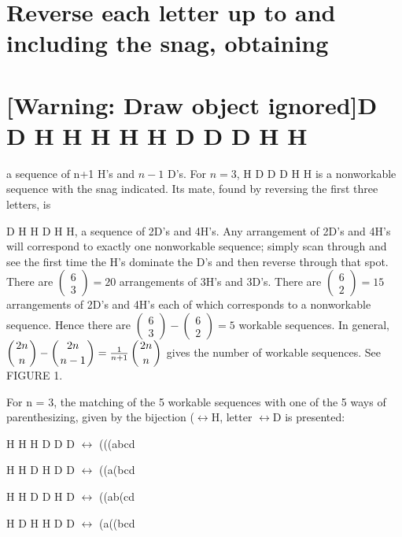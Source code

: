 \documentclass{article}
\begin{document}
\section[Reverse each letter up to and including the snag, obtaining]{Reverse each letter up to and including the snag,
obtaining}
\section[D D H H H H H D D D H H]{[Warning: Draw object ignored]D D H H H H H D D D H H}
a sequence of n+1 H’s and  $n-1$ D’s. For  $n=3$, H D D D H H is a nonworkable sequence with the snag indicated. Its
mate, found by reversing the first three letters, is 

D H H D H H, a sequence of 2D’s and 4H’s. Any arrangement of 2D’s and 4H’s will correspond to exactly one nonworkable
sequence; simply scan through and see the first time the H’s dominate the D’s and then reverse through that spot. There
are  $\left(\begin{matrix}6\\3\end{matrix}\right)=20$ arrangements of 3H’s and 3D’s. There are 
$\left(\begin{matrix}6\\2\end{matrix}\right)=15$ arrangements of 2D’s and 4H’s each of which corresponds to a
nonworkable sequence. Hence there are 
$\left(\begin{matrix}6\\3\end{matrix}\right)-\left(\begin{matrix}6\\2\end{matrix}\right)=5$ workable sequences. In
general,  $\left(\genfrac{}{}{0pt}{0}{2n}n\right)-\left(\genfrac{}{}{0pt}{0}{2n}{n-1}\right)=\frac
1{n+1}\left(\genfrac{}{}{0pt}{0}{2n}n\right)$ gives the number of workable sequences. See FIGURE 1.

For n = 3, the matching of the 5 workable sequences with one of the 5 ways of parenthesizing, given by the bijection
($\leftrightarrow $H, letter $\leftrightarrow $D is presented:

H H H D D D $\leftrightarrow $ (((abcd

H H D H D D $\leftrightarrow $ ((a(bcd

H H D D H D $\leftrightarrow $ ((ab(cd

H D H H D D $\leftrightarrow $ (a((bcd
\end{document}
